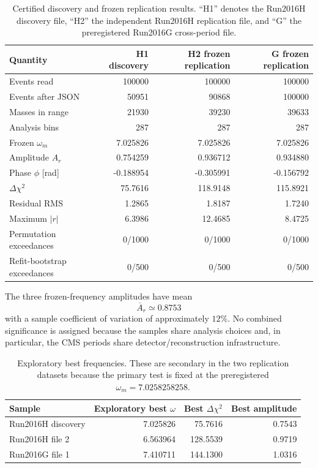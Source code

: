 \documentclass[11pt]{article}
\begin{document}
\begin{table}[H]
\centering
\small
\caption{Certified discovery and frozen replication results.  ``H1'' denotes
the Run2016H discovery file, ``H2'' the independent Run2016H replication file,
and ``G'' the preregistered Run2016G cross-period file.}
\label{tab:main}
\begin{tabular}{lrrr}
\toprule
Quantity & H1 discovery & H2 frozen replication & G frozen replication\\
\midrule
Events read & 100000 & 100000 & 100000\\
Events after JSON & 50951 & 90868 & 100000\\
Masses in range & 21930 & 39230 & 39633\\
Analysis bins & 287 & 287 & 287\\
Frozen \(\omega_m\) & 7.025826 & 7.025826 & 7.025826\\
Amplitude \(A_r\) & 0.754259 & 0.936712 & 0.934880\\
Phase \(\phi\) [rad] & -0.188954 & -0.305991 & -0.156792\\
\(\Delta\chi^2\) & 75.7616 & 118.9148 & 115.8921\\
Residual RMS & 1.2865 & 1.8187 & 1.7240\\
Maximum \(|r|\) & 6.3986 & 12.4685 & 8.4725\\
Permutation exceedances & 0/1000 & 0/1000 & 0/1000\\
Refit-bootstrap exceedances & 0/500 & 0/500 & 0/500\\
\bottomrule
\end{tabular}
\end{table}

The three frozen-frequency amplitudes have mean
\begin{equation}
\overline{A}_r \simeq 0.8753
\end{equation}
with a sample coefficient of variation of approximately \(12\%\).
No combined significance is assigned because the samples share analysis
choices and, in particular, the CMS periods share detector/reconstruction
infrastructure.

\begin{table}[H]
\centering
\small
\caption{Exploratory best frequencies.  These are secondary in the two
replication datasets because the primary test is fixed at the preregistered
\(\omega_m=7.0258258258\).}
\begin{tabular}{lrrr}
\toprule
Sample & Exploratory best \(\omega\) & Best \(\Delta\chi^2\) & Best amplitude\\
\midrule
Run2016H discovery & 7.025826 & 75.7616 & 0.7543\\
Run2016H file 2 & 6.563964 & 128.5539 & 0.9719\\
Run2016G file 1 & 7.410711 & 144.1300 & 1.0316\\
\bottomrule
\end{tabular}
\end{table}
\end{document}
